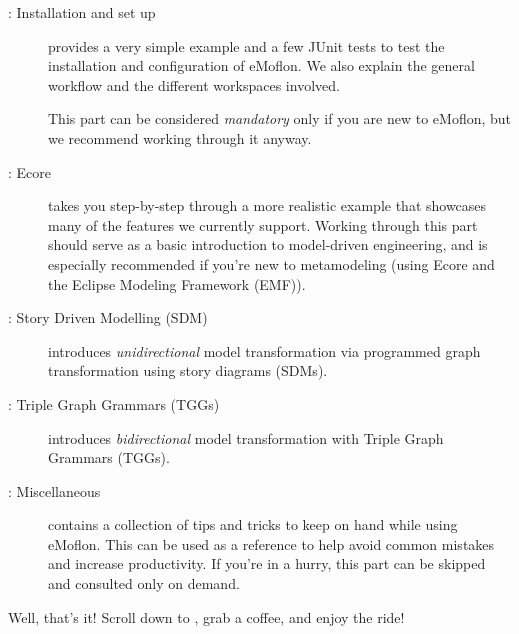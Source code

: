 \begin{description}

\pagebreak

\item[\Cref{chap:installation}: Installation and set up] provides a very simple example and a few JUnit tests to test the installation and configuration of eMoflon.
We also explain the general workflow and the different workspaces involved.

This part can be considered \emph{mandatory} only if you are new to eMoflon, but we recommend working through it anyway.

\item[\Cref{chap:ecore}: Ecore] takes you step-by-step through a more realistic example that showcases many of the features we currently support.
Working through this part should serve as a basic introduction to model-driven engineering, and is especially recommended if you're new to metamodeling
(using Ecore and the Eclipse Modeling Framework (EMF)).


\item[\Cref{chap:sdm}: Story Driven Modelling (SDM)] introduces \emph{unidirectional} model transformation via programmed graph transformation using story diagrams (SDMs).


\item[\Cref{chap:Learning-Box-to-Dictionary-and-Back-Again}: Triple Graph Grammars (TGGs)] introduces \emph{bidirectional} model transformation with Triple Graph Grammars (TGGs).


\item[\Cref{chap:misc}: Miscellaneous] contains a collection of tips and tricks to keep
on hand while using eMoflon. This can be used as a reference to help avoid common mistakes and increase productivity. If you're in a hurry, this part can be skipped and consulted only on demand.

\end{description}

Well, that's it! Scroll down to , grab a coffee, and enjoy the ride!
